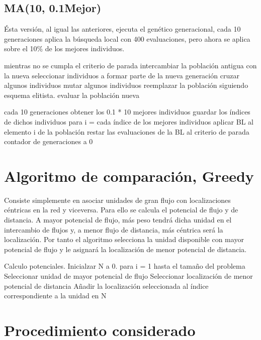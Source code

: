 \documentclass[twoside]{article}
\begin{document}
\subsection{MA(10, 0.1Mejor)}

Ésta versión, al igual las anteriores, ejecuta el genético generacional,
cada 10 generaciones aplica la búsqueda local con 400 evaluaciones, pero
ahora se aplica sobre el 10\% de los mejores individuos.

\begin{pythoncode}
mientras no se cumpla el criterio de parada
    intercambiar la población antigua con la nueva
    seleccionar individuos a formar parte de la nueva generación
    cruzar algunos individuos
    mutar algunos individuos
    reemplazar la población siguiendo esquema elitista.
    evaluar la población nueva

    cada 10 generaciones
        obtener los 0.1 * 10 mejores individuos
        guardar los índices de dichos individuos
        para i = cada índice de los mejores individuos
            aplicar BL al elemento i de la población
            restar las evaluaciones de la BL al criterio de parada
            contador de generaciones a 0
\end{pythoncode}

\section{Algoritmo de comparación, Greedy}

Consiste simplemente en asociar unidades de gran flujo con localizaciones céntricas en la red y viceversa. Para ello se calcula el potencial de flujo y de distancia. A mayor potencial de flujo, más peso tendrá dicha unidad en el intercambio de flujos y, a menor flujo de distancia, más céntrica será la localización. Por tanto el algoritmo selecciona la unidad disponible con mayor potencial de flujo y le asignará la localización de menor potencial de distancia.

\begin{pythoncode}
    Calculo potenciales.
    Inicialzar N a 0.
    para i = 1 hasta el tamaño del problema
        Seleccionar unidad de mayor potencial de flujo
        Seleccionar localización de menor potencial de distancia
        Añadir la localización seleccionada al índice correspondiente a la unidad en N
\end{pythoncode}


\section{Procedimiento considerado}
\end{document}

